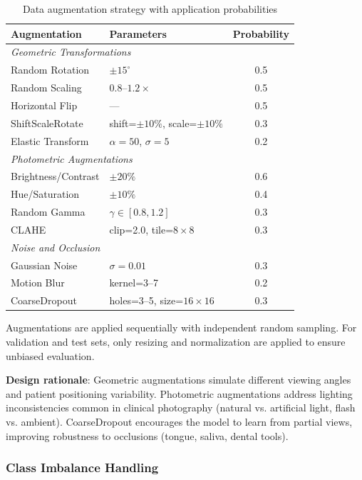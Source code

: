 \begin{table}[t]
\centering
\caption{Data augmentation strategy with application probabilities}
\label{tab:augmentation}
\small
\setlength{\tabcolsep}{6pt}
\begin{tabular}{p{5.2cm} p{7.5cm} c}
\toprule
\textbf{Augmentation} & \textbf{Parameters} & \textbf{Probability} \\
\midrule
\multicolumn{3}{l}{\textit{Geometric Transformations}} \\
Random Rotation & $\pm 15^\circ$ & 0.5 \\
Random Scaling & $0.8$--$1.2\times$ & 0.5 \\
Horizontal Flip & --- & 0.5 \\
ShiftScaleRotate & shift=$\pm10\%$, scale=$\pm10\%$ & 0.3 \\
Elastic Transform & $\alpha=50$, $\sigma=5$ & 0.2 \\
\midrule
\multicolumn{3}{l}{\textit{Photometric Augmentations}} \\
Brightness/Contrast & $\pm 20\%$ & 0.6 \\
Hue/Saturation & $\pm 10\%$ & 0.4 \\
Random Gamma & $\gamma \in [0.8, 1.2]$ & 0.3 \\
CLAHE & clip=2.0, tile=$8\times8$ & 0.3 \\
\midrule
\multicolumn{3}{l}{\textit{Noise and Occlusion}} \\
Gaussian Noise & $\sigma=0.01$ & 0.3 \\
Motion Blur & kernel=3--7 & 0.2 \\
CoarseDropout & holes=3--5, size=$16\times16$ & 0.3 \\
\bottomrule
\end{tabular}
\end{table}



Augmentations are applied sequentially with independent random sampling. For validation and test sets, only resizing and normalization are applied to ensure unbiased evaluation.

\textbf{Design rationale}: Geometric augmentations simulate different viewing angles and patient positioning variability. Photometric augmentations address lighting inconsistencies common in clinical photography (natural vs. artificial light, flash vs. ambient). CoarseDropout encourages the model to learn from partial views, improving robustness to occlusions (tongue, saliva, dental tools).

\subsubsection{Class Imbalance Handling}

